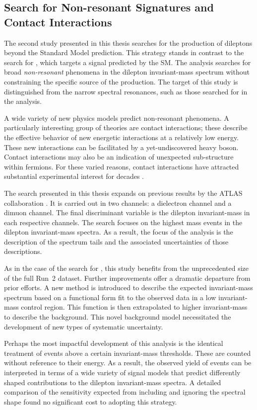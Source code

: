 \subsection{Search for Non-resonant Signatures and Contact Interactions}
The second study presented in this thesis searches for the production of dileptons beyond the Standard Model prediction.
This strategy stands in contrast to the search for \hmm, which targets a signal predicted by the SM.
The analysis searches for broad \emph{non-resonant} phenomena in the dilepton invariant-mass spectrum without constraining the specific source of the production.
The target of this study is distinguished from the narrow spectral resonances, such as those searched for in the \hmm analysis.

A wide variety of new physics models predict non-resonant phenomena.
A particularly interesting group of theories are contact interactions; these describe the effective behavior of new energetic interactions at a relatively low energy.
These new interactions can be facilitated by a yet-undiscovered heavy boson.
Contact interactions may also be an indication of unexpected sub-structure within fermions.
For these varied reasons, contact interactions have attracted substantial experimental interest for decades \cite{eichten,zeusCi,alephCi}.

The search presented in this thesis expands on previous results by the ATLAS collaboration \cite{EXOT-2016-05,EXOT-2015-07,EXOT-2013-19,EXOT-2012-17}.
It is carried out in two channels: a dielectron channel and a dimuon channel.
The final discriminant variable is the dilepton invariant-mass in each respective channels.
The search focuses on the highest mass events in the dilepton invariant-mass spectra.
As a result, the focus of the analysis is the description of the spectrum tails and the associated uncertainties of those descriptions.

As in the case of the search for \hmm, this study benefits from the unprecedented size of the full Run~2 dataset.
Further improvements offer a dramatic departure from prior efforts.
A new method is introduced to describe the expected invariant-mass spectrum based on a functional form fit to the observed data in a low invariant-mass control region.
This function is then extrapolated to higher invariant-mass to describe the background. 
This novel background model necessitated the development of new types of systematic uncertainty.

Perhaps the most impactful development of this analysis is the identical treatment of events above a certain invariant-mass thresholds.
These are counted without reference to their energy.
As a result, the observed yield of events can be interpreted in terms of a wide variety of signal models that predict differently shaped contributions to the dilepton invariant-mass spectra.
A detailed comparison of the sensitivity expected from including and ignoring the spectral shape found no significant cost to adopting this strategy. 

